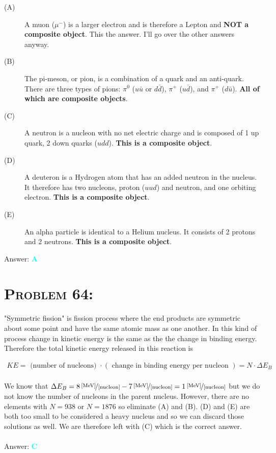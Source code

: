 \documentclass{article}
\begin{document}
\begin{description}

\item[(A)] A muon ($\mu^{-}$) is a larger electron and is therefore a Lepton and \textbf{NOT a composite object}. This the answer. I'll go over the other answers anyway.

\item[(B)] The pi-meson, or pion, is a combination of a quark and an anti-quark. There are three types of pions: $\pi^{0}$ ($u \bar{u}$ or $d \bar{d}$), $\pi^{+}$ ($u \bar{d}$), and $\pi^{+}$ ($d \bar{u}$). \textbf{All of which are composite objects}.

\item[(C)] A neutron is a nucleon with no net electric charge and is composed of 1 up quark, 2 down quarks ($udd$). \textbf{This is a composite object}.

\item[(D)] A deuteron is a Hydrogen atom that has an added neutron in the nucleus. It therefore has two nucleons, proton ($uud$) and neutron, and one orbiting electron. \textbf{This is a composite object}.

\item[(E)] An alpha particle is identical to a Helium nucleus. It consists of 2 protons and 2 neutrons. \textbf{This is a composite object}.
\\

\end{description}
Answer: \textbf{\textcolor{cyan}A}\\


\section{\textsc{Problem 64:}} "Symmetric fission" is fission process where the end products are symmetric about some point and have the same atomic mass as one another. In this kind of process change in kinetic energy is the same as the the change in binding energy. Therefore the total kinetic energy released in this reaction is

\begin{gather}
KE = \text{ (number of nucleons) }\cdot (\text{ change in binding energy per nucleon }) = N \cdot \Delta E_{B}\nonumber
\end{gather}
\\
We know that $\Delta E_{B} =  \unitfrac[8]{[MeV]}{[nucleon]} -  \unitfrac[7]{[MeV]}{[nucleon]} = \unitfrac[1]{[MeV]}{[nucleon]} $ but we do not know the number of nucleons in the parent nucleus. However, there are no elements with $N = 938$ or $N = 1876$ so eliminate (A) and (B). (D) and (E) are both too small to be considered a heavy nucleus and so we can discard those solutions as well. We are therefore left with (C) which is the correct answer.
\\\\
Answer: \textbf{\textcolor{cyan}C}\\
\end{document}
